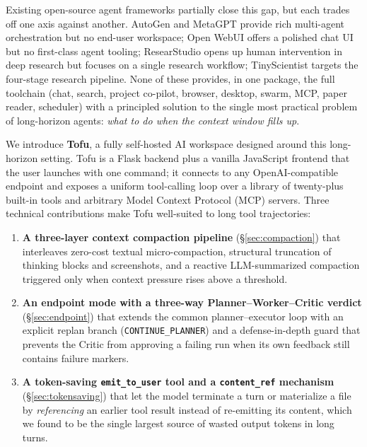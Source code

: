 \documentclass[11pt]{article}
\begin{document}
Existing open-source agent frameworks partially close this gap, but each
trades off one axis against another. AutoGen and MetaGPT provide rich
multi-agent orchestration but no end-user workspace; Open WebUI offers a
polished chat UI but no first-class agent tooling; ResearStudio
\citep{ResearStudio} opens up human intervention in deep research but
focuses on a single research workflow; TinyScientist
\citep{tinyscientist} targets the four-stage research pipeline. None of
these provides, in one package, the full toolchain (chat, search, project
co-pilot, browser, desktop, swarm, MCP, paper reader, scheduler) with a
principled solution to the single most practical problem of long-horizon
agents: \emph{what to do when the context window fills up}.

We introduce \textbf{Tofu}, a fully self-hosted AI workspace designed
around this long-horizon setting. Tofu is a Flask backend plus a vanilla
JavaScript frontend that the user launches with one command; it connects
to any OpenAI-compatible endpoint and exposes a uniform tool-calling loop
over a library of twenty-plus built-in tools and arbitrary Model Context
Protocol (MCP) servers. Three technical contributions make Tofu
well-suited to long tool trajectories:

\begin{enumerate}
\itemsep 1pt
\item \textbf{A three-layer context compaction pipeline}
  (\S\ref{sec:compaction}) that interleaves zero-cost textual
  micro-compaction, structural truncation of thinking blocks and
  screenshots, and a reactive LLM-summarized compaction triggered only
  when context pressure rises above a threshold.
\item \textbf{An endpoint mode with a three-way Planner--Worker--Critic
  verdict} (\S\ref{sec:endpoint}) that extends the common
  planner--executor loop with an explicit replan branch
  (\texttt{CONTINUE\_PLANNER}) and a defense-in-depth guard that prevents
  the Critic from approving a failing run when its own feedback still
  contains failure markers.
\item \textbf{A token-saving \texttt{emit\_to\_user} tool and a
  \texttt{content\_ref} mechanism} (\S\ref{sec:tokensaving}) that let the
  model terminate a turn or materialize a file by \emph{referencing} an
  earlier tool result instead of re-emitting its content, which we found
  to be the single largest source of wasted output tokens in long turns.
\end{enumerate}
\end{document}
